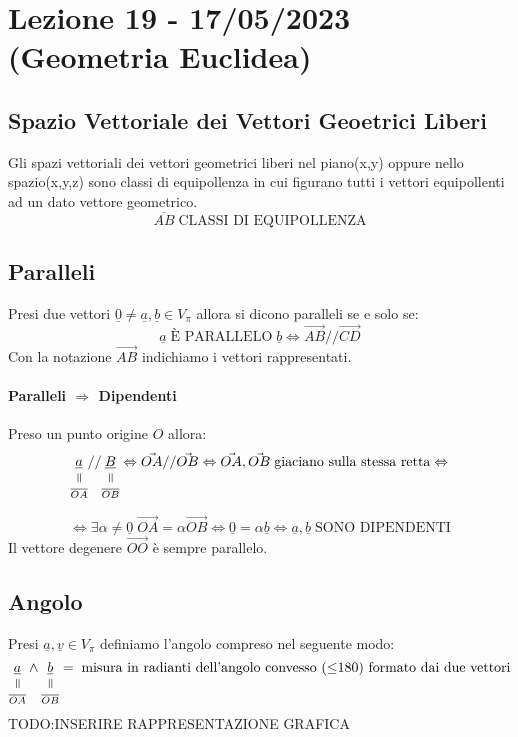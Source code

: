 \section{Lezione 19 - 17/05/2023 (Geometria Euclidea)}

\subsection{Spazio Vettoriale dei Vettori Geoetrici Liberi}
Gli spazi vettoriali dei vettori geometrici liberi nel piano(x,y) oppure nello spazio(x,y,z) sono classi di equipollenza in cui figurano
tutti i vettori equipollenti ad un dato vettore geometrico.\\
$$ \overline{AB} \; \text{CLASSI DI EQUIPOLLENZA} $$

\subsection{Paralleli}
Presi due vettori $ \underline{0} \neq \underline{a}, \underline{b} \in V_{\pi}$ allora si dicono paralleli se e solo se:
$$ \underline{a} \; \text{È PARALLELO} \; \underline{b} \Leftrightarrow \vec{AB} // \vec{CD} $$
Con la notazione $\vec{AB}$ indichiamo i vettori rappresentati.\\
\paragraph{Paralleli $\Rightarrow$ Dipendenti}
Preso un punto origine $O$ allora:
$$ \equalto{\underline{a}}{\overline{OA}} // \equalto{\underline{B}}{\overline{OB}} \Leftrightarrow \vec{OA} // \vec{OB} \Leftrightarrow \vec{OA}, \vec{OB} \; \text{giaciano sulla stessa retta} \Leftrightarrow$$
 
$$\Leftrightarrow \exists \alpha \neq \underline{0} \; \vec{OA} = \alpha \vec{OB} \Leftrightarrow \underline{0}=\alpha\underline{b} \Leftrightarrow \underline{a}, \underline{b} \; \text{SONO DIPENDENTI} $$
Il vettore degenere $\vec{OO}$ è sempre parallelo.\\

\subsection{Angolo}
Presi $\underline{a}, \underline{v} \in V_{\pi}$ definiamo l'angolo compreso nel seguente modo:
$$ \equalto{\underline{a}}{\overline{OA}} \wedge \equalto{\underline{b}}{\overline{OB}} = \; \text{misura in radianti dell'angolo convesso ($\le $180) formato dai due vettori} $$
TODO:INSERIRE RAPPRESENTAZIONE GRAFICA

